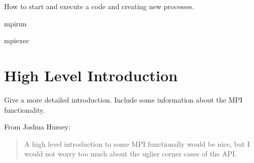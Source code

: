 How to start and execute a code and creating new processes. 

mpirun

mpiexec

\section{High Level Introduction}

Give a more detailed introduction. Include some information about the
MPI functionality. 

From Joshua Hursey: 
\begin{quote}
  A high level introduction to some MPI functionally would be nice,
  but I would not worry too much about the uglier corner cases of the
  API.
\end{quote}



